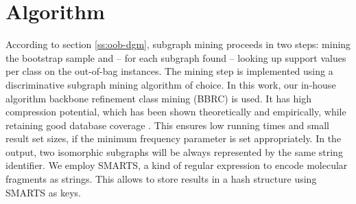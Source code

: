 \documentclass{article}
\begin{document}
\section{Algorithm}
\label{s:Algorithm}
According to section \ref{ss:oob-dgm}, subgraph mining proceeds in two steps:
mining the bootstrap sample and -- for each subgraph found -- looking up
support values per class on the out-of-bag instances.  The mining step is
implemented using a discriminative subgraph mining algorithm of choice. In this
work, our in-house algorithm backbone refinement class mining (BBRC)
\cite{maunz09largescale} is used.  It has high compression potential, which has
been shown theoretically and empirically, while retaining good database
coverage \cite{maunz11efficient}.  This ensures low running times and small
result set sizes, if the minimum frequency parameter is set appropriately. In
the output, two isomorphic subgraphs will be always represented by the same
string identifier.  We employ SMARTS, a kind of regular expression to encode
molecular fragments as strings.  This allows to store results in a hash
structure using SMARTS as keys.

\end{document}
